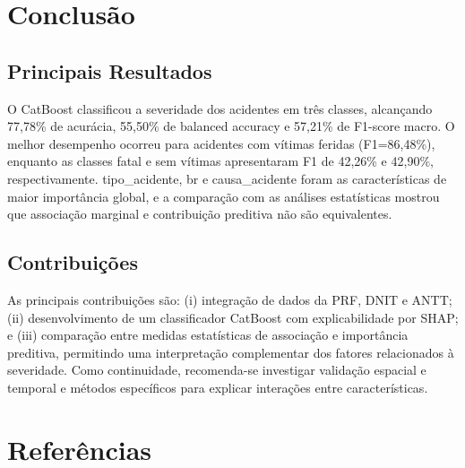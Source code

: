 \documentclass[12pt]{article}
\begin{document}
\section{Conclusão}
\subsection{Principais Resultados}
O CatBoost classificou a severidade dos acidentes em três classes, alcançando 77,78\% de acurácia, 55,50\% de balanced accuracy e 57,21\% de F1-score macro. O melhor desempenho ocorreu para acidentes com vítimas feridas (F1=86,48\%), enquanto as classes fatal e sem vítimas apresentaram F1 de 42,26\% e 42,90\%, respectivamente. tipo\_acidente, br e causa\_acidente foram as características de maior importância global, e a comparação com as análises estatísticas mostrou que associação marginal e contribuição preditiva não são equivalentes.

\subsection{Contribuições}
As principais contribuições são: (i) integração de dados da PRF, DNIT e ANTT; (ii) desenvolvimento de um classificador CatBoost com explicabilidade por SHAP; e (iii) comparação entre medidas estatísticas de associação e importância preditiva, permitindo uma interpretação complementar dos fatores relacionados à severidade. Como continuidade, recomenda-se investigar validação espacial e temporal e métodos específicos para explicar interações entre características.

\section{Referências}


\end{document}
